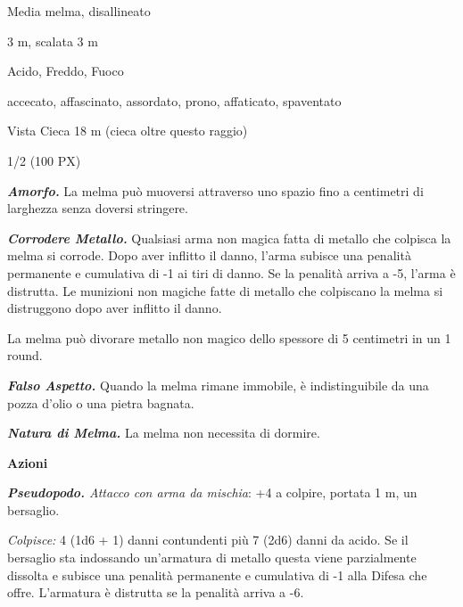 \begin{multicols}{2}
{
\begin{description}[noitemsep, topsep=0pt, parsep=0pt, partopsep=0pt, itemsep=1pt, leftmargin=2.35cm,  labelwidth=2.2cm, itemindent=0cm, listparindent=0pt] %
\setlength{\baselineskip}{10pt}
\item[\textbf{Taglia/Tipo}] Media melma, disallineato
\item[\textbf{Caratt.}] 
\item[\textbf{Punti Ferita}] 
\item[\textbf{Movimento}] 3 m, scalata 3 m
\item[\textbf{Tiri Salvez.}] 
\item[\textbf{Res. Danni}] Acido, Freddo, Fuoco
\item[\textbf{Immunità}] accecato, affascinato, assordato, prono, affaticato, spaventato
\item[\textbf{Sensi}] Vista Cieca 18 m (cieca oltre questo raggio)
\item[\textbf{Sfida}] 1/2 (100 PX)
\end{description}
\smallskip

\emph{\textbf{Amorfo.}} La melma può muoversi attraverso uno spazio fino a centimetri di larghezza senza doversi stringere.

\emph{\textbf{Corrodere Metallo.}} Qualsiasi arma non magica fatta di metallo che colpisca la melma si corrode. Dopo aver inflitto il danno, l'arma subisce una penalità permanente e cumulativa di -1 ai tiri di danno. Se la penalità arriva a -5, l'arma è distrutta. Le munizioni non magiche fatte di metallo che colpiscano la melma si distruggono dopo aver inflitto il danno.

La melma può divorare metallo non magico dello spessore di 5 centimetri in un 1 round.

\emph{\textbf{Falso Aspetto.}} Quando la melma rimane immobile, è indistinguibile da una pozza d'olio o una pietra bagnata.

\emph{\textbf{Natura di Melma.}} La melma non necessita di dormire.

\textbf{Azioni}

\emph{\textbf{Pseudopodo.} Attacco con arma da mischia}: +4 a colpire, portata 1 m, un bersaglio.

\emph{Colpisce:} 4 (1d6 + 1) danni contundenti più 7 (2d6) danni da acido. Se il bersaglio sta indossando un'armatura di metallo questa viene parzialmente dissolta e subisce una penalità permanente e cumulativa di -1 alla Difesa che offre. L'armatura è distrutta se la penalità arriva a -6.

}
\end{multicols}
